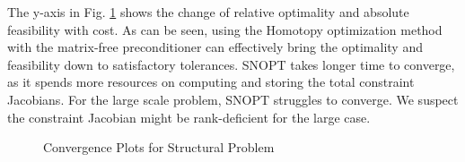\documentclass{article}
\theoremstyle{definition}
\begin{document}
The y-axis in Fig. \ref{fig:struct2} shows the change of relative optimality and absolute feasibility with cost. As can be seen, using the Homotopy optimization method with the matrix-free preconditioner can effectively bring the optimality and feasibility down to satisfactory tolerances. SNOPT takes longer time to converge, as it spends more resources on computing and storing the total constraint Jacobians. For the large scale problem, SNOPT struggles to converge. We suspect the constraint Jacobian might be rank-deficient for the large case. 
\begin{figure}[H]
\centering


\caption{Convergence Plots for Structural Problem}
\label{fig:struct2}
\end{figure}
\end{document}
